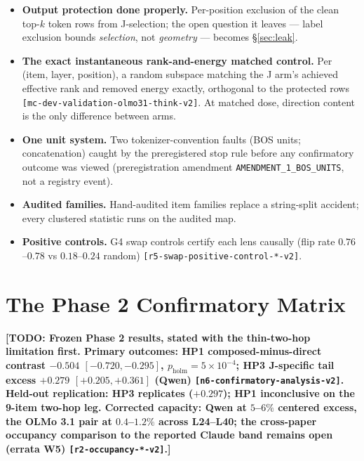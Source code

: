 \documentclass[twoside,twocolumn]{article}
\newcommand{\eid}[1]{{\footnotesize\texttt{[#1]}}}          %
\newcommand{\todo}[1]{{\color{red!70!black}\textbf{[TODO: #1]}}}
\begin{document}
\begin{itemize}
  \item \textbf{Output protection done properly.}  Per-position
  exclusion of the clean top-$k$ token rows from J-selection; the open
  question it leaves --- label exclusion bounds \emph{selection}, not
  \emph{geometry} --- becomes \S\ref{sec:leak}.
  \item \textbf{The exact instantaneous rank-and-energy matched
  control.}  Per (item, layer, position), a random subspace matching
  the J arm's achieved effective rank and removed energy exactly,
  orthogonal to the protected rows
  \eid{mc-dev-validation-olmo31-think-v2}.  At matched dose, direction
  content is the only difference between arms.
  \item \textbf{One unit system.}  Two tokenizer-convention faults
  (BOS units; concatenation) caught by the preregistered stop rule
  before any confirmatory outcome was viewed (preregistration
  amendment \texttt{AMENDMENT\_1\_BOS\_UNITS}, not a registry event).
  \item \textbf{Audited families.}  Hand-audited item families replace
  a string-split accident; every clustered statistic runs on the
  audited map.
  \item \textbf{Positive controls.}  G4 swap controls certify each
  lens causally (flip rate $0.76$--$0.78$ vs $0.18$--$0.24$ random)
  \eid{r5-swap-positive-control-*-v2}.
\end{itemize}

\section{The Phase 2 Confirmatory Matrix}\label{sec:phase2}

\todo{Frozen Phase 2 results, stated with the thin-two-hop limitation
first.  Primary outcomes: HP1 composed-minus-direct contrast $-0.504$
$[-0.720, -0.295]$, $p_{\mathrm{holm}}=5\times10^{-4}$; HP3 J-specific
tail excess $+0.279$ $[+0.205, +0.361]$ (Qwen)
\eid{n6-confirmatory-analysis-v2}.  Held-out replication: HP3
replicates ($+0.297$); HP1 inconclusive on the 9-item two-hop leg.
Corrected capacity: Qwen at $5$--$6\%$ centered excess, the OLMo 3.1
pair at $0.4$--$1.2\%$ across L24--L40; the cross-paper occupancy
comparison to the reported Claude band remains open (errata W5)
\eid{r2-occupancy-*-v2}.}

\end{document}
